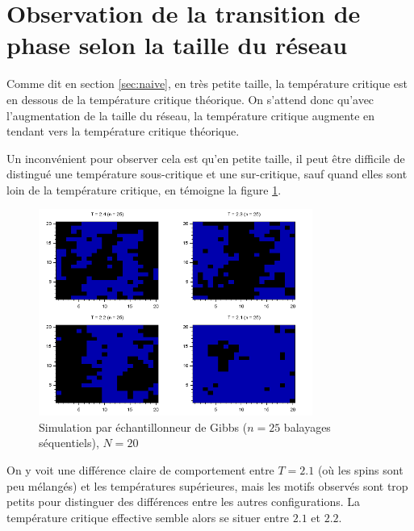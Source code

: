\documentclass[a4paper,11pt]{article}
\begin{document}
\section{Observation de la transition de phase selon la taille du réseau}\label{sec:tc}

Comme dit en section \ref{sec:naive}, en très petite taille, la température critique est en dessous de la température critique théorique. On s'attend donc qu'avec l'augmentation de la taille du réseau, la température critique augmente en tendant vers la température critique théorique.

Un inconvénient pour observer cela est qu'en petite taille, il peut être difficile de distingué une température sous-critique et une sur-critique, sauf quand elles sont loin de la température critique, en témoigne la figure \ref{fig:tc_gibbs_N20_n25}.
\begin{figure}[!htbp]
	\centering
	\includegraphics[width=0.8\textwidth]{temperature_critique_gibbs_N20_n25.png}
	\caption{Simulation par échantillonneur de Gibbs ($n = 25$ balayages séquentiels), $N = 20$}
	\label{fig:tc_gibbs_N20_n25}
\end{figure}
On y voit une différence claire de comportement entre $T = 2.1$ (où les spins sont peu mélangés) et les températures supérieures, mais les motifs observés sont trop petits pour distinguer des différences entre les autres configurations. La température critique effective semble alors se situer entre $2.1$ et $2.2$.
\end{document}
